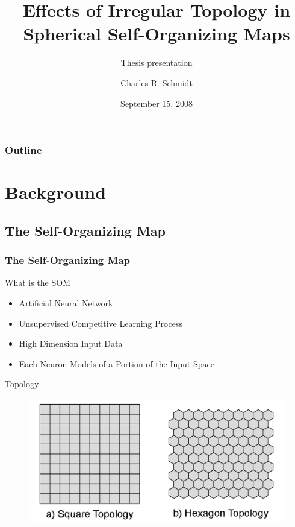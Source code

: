 \documentclass[nototal,handout]{beamer}
\author[Schmidt]{Charles R. Schmidt}
\institute[SDSU]{Department of Geography\\San Diego State University}
\title[Irregular Topology in Spherical-SOM]{Effects of Irregular Topology in Spherical Self-Organizing Maps}
\subtitle{Thesis presentation}
\date[Thesis]{September 15, 2008}
\begin{document}
\begin{frame}
  \titlepage
\end{frame}
\begin{frame}
  \frametitle{Outline}
  \tableofcontents[pausesections]
\end{frame}



\section{Background} 

\subsection{The Self-Organizing Map} 

\begin{frame}
	\frametitle{The Self-Organizing Map}
 
\begin{block}{What is the SOM}
 \begin{itemize}
 \item  Artificial Neural Network
 \item  Unsupervised Competitive Learning Process
 \item  High Dimension Input Data
 \item  Each Neuron Models of a Portion of the Input Space
 \end{itemize}
 \end{block} 
\begin{block}{Topology}
  \begin{center}
  \begin{figure}
  \includegraphics[width=0.60\linewidth]{topology.png}
  \end{figure}
  \end{center}
 \end{block} \end{frame} 
\end{document}
